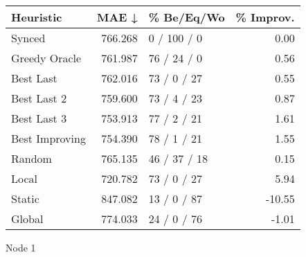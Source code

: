 \begin{tabular}{lrlr}
\toprule
\textbf{Heuristic} & \textbf{MAE ↓} & \textbf{\% Be/Eq/Wo} & \textbf{\% Improv.} \\
\midrule
            Synced &        766.268 &          0 / 100 / 0 &                0.00 \\
     Greedy Oracle &        761.987 &          76 / 24 / 0 &                0.56 \\
         Best Last &        762.016 &          73 / 0 / 27 &                0.55 \\
       Best Last 2 &        759.600 &          73 / 4 / 23 &                0.87 \\
       Best Last 3 &        753.913 &          77 / 2 / 21 &                1.61 \\
    Best Improving &        754.390 &          78 / 1 / 21 &                1.55 \\
            Random &        765.135 &         46 / 37 / 18 &                0.15 \\
             Local &        720.782 &          73 / 0 / 27 &                5.94 \\
            Static &        847.082 &          13 / 0 / 87 &              -10.55 \\
            Global &        774.033 &          24 / 0 / 76 &               -1.01 \\
\bottomrule
\end{tabular}
\caption{Node 1}
\label{tab:non_lr01_le2_bs4_1}
